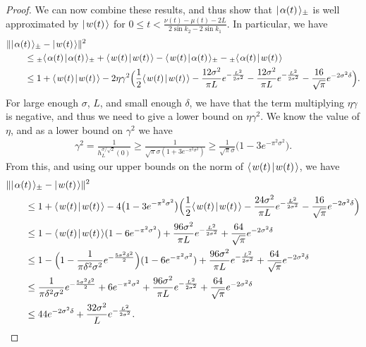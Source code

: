 \documentclass[../thesis-main/thesis-main]{subfiles}
\begin{document}
\begin{proof}
We can now combine these results, and thus show that $|\mspace{2mu} \alpha(t) \mspace{2mu} \rangle_{\pm}$ is well approximated by $|\mspace{2mu} w(t) \mspace{2mu} \rangle$ for $0\leq t < \frac{\nu(t) - \mu(t) - 2 L}{2 \sin k_2 - 2 \sin k_1}$.  In particular, we have
\begin{align}
   &\|{|\mspace{2mu} \alpha(t) \mspace{2mu} \rangle_{\pm} - |\mspace{2mu} w(t) \mspace{2mu} \rangle}\|^2\nonumber\\
    &\qquad\leq {}_{\pm}\langle\mspace{2mu} \alpha(t) \mspace{2mu} | \mspace{2mu} \alpha(t)\mspace{2mu} \rangle_{\pm} + \langle\mspace{2mu} w(t) \mspace{2mu} | \mspace{2mu} w(t)\mspace{2mu} \rangle - \langle\mspace{2mu} w(t) \mspace{2mu} | \mspace{2mu} \alpha(t)\mspace{2mu} \rangle_{\pm} - {}_\pm \langle\mspace{2mu} \alpha(t) \mspace{2mu} | \mspace{2mu} w(t)\mspace{2mu} \rangle\\
    &\qquad \leq 1 + \langle\mspace{2mu} w(t) \mspace{2mu} | \mspace{2mu} w(t)\mspace{2mu} \rangle - 2 \eta\gamma^2 \Big(\frac{1}{2} \langle\mspace{2mu} w(t) \mspace{2mu} | \mspace{2mu} w(t)\mspace{2mu} \rangle - \frac{12 \sigma^2}{\pi L} e^{ -\frac{L^2}{2\sigma^2}} - \frac{12 \sigma^2}{\pi L} e^{ - \frac{L^2}{2\sigma^2}} -  \frac{16}{\sqrt{\pi}} e^{-2\sigma^2 \delta}\Big).
\end{align}
For large enough $\sigma$, $L$, and small enough $\delta$, we have that the term multiplying $\eta\gamma$ is negative, and thus we need to give a lower bound on $\eta\gamma^2$.  We know the value of $\eta$, and as a lower bound on $\gamma^2$ we have
\begin{align}
  \gamma^2 = \frac{1}{h_L^{\sigma/\sqrt{2}}(0)} \geq \frac{1}{\sqrt{\pi} \sigma (1 + 3 e^{-\pi^2\sigma^2})} \geq \frac{1}{\sqrt{\pi} \sigma} \big(1 - 3 e^{-\pi^2 \sigma^2}\big).
\end{align}
From this, and using our upper bounds on the norm of $\langle\mspace{2mu} w(t) \mspace{2mu} | \mspace{2mu} w(t)\mspace{2mu} \rangle$, we have
\begin{align}
 &\|{|\mspace{2mu} \alpha(t) \mspace{2mu} \rangle_{\pm} - |\mspace{2mu} w(t) \mspace{2mu} \rangle}\|^2 \nonumber\\
 &\qquad \leq 1 + \langle\mspace{2mu} w(t) \mspace{2mu} | \mspace{2mu} w(t)\mspace{2mu} \rangle - 4 \big(1 - 3 e^{-\pi^2 \sigma^2} \big) \Big(\frac{1}{2} \langle\mspace{2mu} w(t) \mspace{2mu} | \mspace{2mu} w(t)\mspace{2mu} \rangle - \frac{24 \sigma^2}{\pi L} e^{ -\frac{L^2}{2\sigma^2}}  -  \frac{16}{\sqrt{\pi}} e^{-2\sigma^2 \delta}\Big)\\
 & \qquad \leq 1 - \langle\mspace{2mu} w(t) \mspace{2mu} | \mspace{2mu} w(t)\mspace{2mu} \rangle (1 -6 e^{-\pi^2 \sigma^2}) + \frac{96 \sigma^2}{\pi L} e^{-\frac{L^2}{2\sigma^2}} + \frac{64}{\sqrt{\pi}} e^{-2\sigma^2 \delta}\\
 & \qquad \leq 1 - \Big( 1 - \frac{1}{\pi \delta^2 \sigma^2} e^{-\frac{5 \sigma^2 \delta^2}{2}} \Big)(1 -6 e^{-\pi^2 \sigma^2}) + \frac{96 \sigma^2}{\pi L} e^{-\frac{L^2}{2\sigma^2}} + \frac{64}{\sqrt{\pi}} e^{-2\sigma^2 \delta}\\
 & \qquad \leq \frac{1}{\pi \delta^2 \sigma^2} e^{-\frac{5 \sigma^2 \delta^2}{2}} + 6 e^{-\pi^2 \sigma^2} + \frac{96 \sigma^2}{\pi L} e^{-\frac{L^2}{2\sigma^2}} + \frac{64}{\sqrt{\pi}} e^{-2\sigma^2 \delta}\\
 &\qquad \leq 44 e^{-2 \sigma^2 \delta} + \frac{32 \sigma^2}{L} e^{-\frac{L^2}{2\sigma^2}}.
\end{align}


\end{proof}
\end{document}
